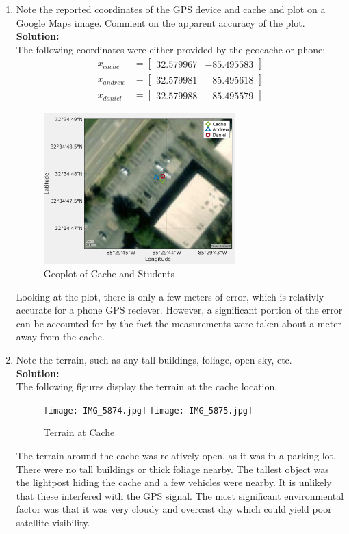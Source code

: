 \documentclass[11pt]{article}
\newcommand{\solution}{\textbf{\\Solution: \\}}
\begin{document}
\begin{enumerate}[label=\textbf{\arabic*.}]
  \itemsep 36pt
  \item Note the reported coordinates of the GPS device and cache and 
  plot on a Google Maps image. Comment on the apparent accuracy of the
  plot.
  \solution
  The following coordinates were either provided by the geocache or phone:
  \begin{equation*}
    \begin{split}
      x_{cache} &=
      \begin{bmatrix}
        32.579967 & -85.495583
      \end{bmatrix}
      \\ x_{andrew} &=
      \begin{bmatrix}
        32.579981 & -85.495618
      \end{bmatrix}
      \\ x_{daniel} &=
      \begin{bmatrix}
        32.579988 & -85.495579
      \end{bmatrix}
    \end{split}
  \end{equation*}
  \begin{figure}[H]
    \centering
    \includegraphics[width=0.7\textwidth]{p1.png}
    \caption{Geoplot of Cache and Students}
  \end{figure}
  Looking at the plot, there is only a few meters of error, which is 
  relativly accurate for a phone GPS reciever. However, a significant 
  portion of the error can be accounted for by the fact the measurements 
  were taken about a meter away from the cache.

  \item Note the terrain, such as any tall buildings, foliage, open sky, etc. 
  \solution
  The following figures display the terrain at the cache location.
  \begin{figure}[H]
    \centering
    \texttt{[image: IMG\_5874.jpg]}
    \texttt{[image: IMG\_5875.jpg]}
    \caption{Terrain at Cache}
  \end{figure}
  The terrain around the cache was relatively open, as it was in a parking 
  lot. There were no tall buildings or thick foliage nearby. The tallest 
  object was the lightpost hiding the cache and a few vehicles were
  nearby. It is unlikely that these interfered with the GPS signal. The 
  most significant environmental factor was that it was very cloudy and 
  overcast day which could yield poor satellite visibility.


\end{enumerate}
\end{document}
